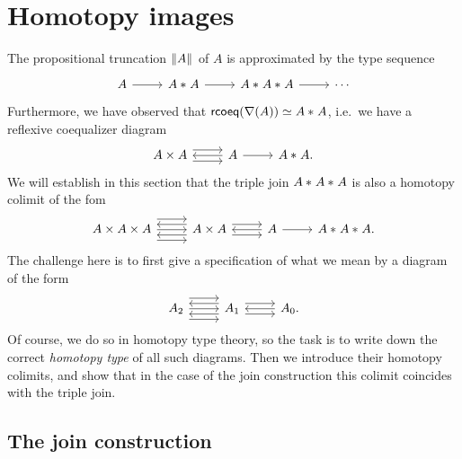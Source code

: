 \chapter{Homotopy images}

The propositional truncation $\Vert A\Vert_{}$ of $A$ is approximated by the type sequence
\begin{equation*}
\begin{tikzcd}
A \arrow[r] & \join{A}{A} \arrow[r] & \join{A}{\join{A}{A}} \arrow[r] & \cdots
\end{tikzcd}
\end{equation*}
Furthermore, we have observed that $\mathsf{rcoeq}(\nabla(A)) \simeq {A}\ast_{}{A}$, i.e.~we have a reflexive coequalizer diagram
\begin{equation*}
\begin{tikzcd}
A\times A \arrow[r,yshift=1ex] \arrow[r,yshift=-1ex] & A \arrow[l] \arrow[r] & \join{A}{A}.
\end{tikzcd}
\end{equation*}
We will establish in this section that the triple join ${A}\ast_{}{{A}\ast_{}{A}}$ is also a homotopy colimit of the fom
\begin{equation*}
\begin{tikzcd}
A\times A \times A \arrow[r,yshift=2ex] \arrow[r] \arrow[r,yshift=-2ex] & A \times A \arrow[l,yshift=1ex] \arrow[l,yshift=-1ex] \arrow[r,yshift=1ex] \arrow[r,yshift=-1ex] & A \arrow[l] \arrow[r] & \join{A}{\join{A}{A}}.
\end{tikzcd}
\end{equation*}
The challenge here is to first give a specification of what we mean by a diagram of the form
\begin{equation*}
\begin{tikzcd}
A_2 \arrow[r,yshift=2ex] \arrow[r] \arrow[r,yshift=-2ex] & A_1 \arrow[l,yshift=1ex] \arrow[l,yshift=-1ex] \arrow[r,yshift=1ex] \arrow[r,yshift=-1ex] & A_0. \arrow[l]
\end{tikzcd}
\end{equation*}
Of course, we do so in homotopy type theory, so the task is to write down the correct \emph{homotopy type} of all such diagrams. Then we introduce their homotopy colimits, and show that in the case of the join construction this colimit coincides with the triple join.

\section{The join construction}

